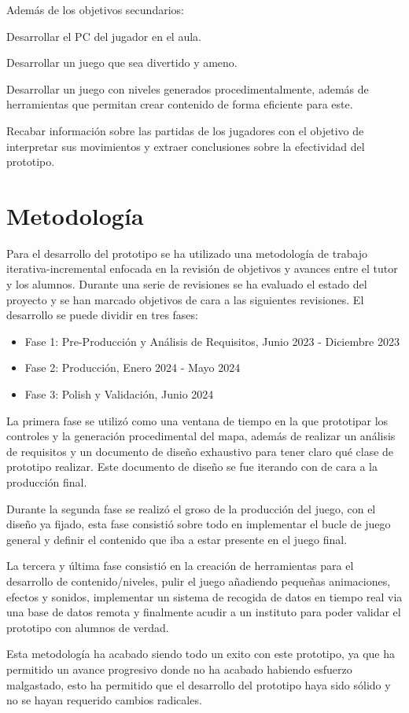Además de los objetivos secundarios:
\begin{compactitem}
  \item Desarrollar el PC del jugador en el aula.
  \item Desarrollar un juego que sea divertido y ameno.
  \item Desarrollar un juego con niveles generados procedimentalmente, además de herramientas que permitan crear contenido de forma eficiente para este.
  \item Recabar información sobre las partidas de los jugadores con el objetivo de interpretar sus movimientos y extraer conclusiones sobre la efectividad del prototipo.
\end{compactitem}

\section{Metodología}

Para el desarrollo del prototipo se ha utilizado una metodología de trabajo iterativa-incremental enfocada en la revisión de objetivos y
avances entre el tutor y los alumnos. Durante una serie de revisiones se ha evaluado el estado del proyecto y se han marcado objetivos de cara a las siguientes revisiones. El desarrollo se puede dividir en tres fases: 
\begin{itemize}
	\item Fase 1: Pre-Producción y Análisis de Requisitos, Junio 2023 - Diciembre 2023
	\item Fase 2: Producción, Enero 2024 - Mayo 2024
	\item Fase 3: Polish y Validación, Junio 2024 
\end{itemize}

La primera fase se utilizó como una ventana de tiempo en la que prototipar los controles y la generación procedimental del mapa, además de realizar un análisis de requisitos y un documento de diseño exhaustivo para tener claro qué clase de prototipo realizar. Este documento de diseño se fue iterando con \nombretutor de cara a la producción final.

Durante la segunda fase se realizó el groso de la producción del juego, con el diseño ya fijado, esta fase consistió sobre todo en implementar el bucle de juego general y definir el contenido que iba a estar presente en el juego final.

La tercera y última fase consistió en la creación de herramientas para el desarrollo de contenido/niveles, pulir el juego añadiendo pequeñas animaciones, efectos y sonidos, implementar un sistema de recogida de datos en tiempo real via una base de datos remota y finalmente acudir a un instituto para poder validar el prototipo con alumnos de verdad.

Esta metodología ha acabado siendo todo un exito con este prototipo, ya que ha permitido un avance progresivo donde no ha acabado habiendo esfuerzo malgastado, esto ha permitido que el desarrollo del prototipo haya sido sólido y no se hayan requerido cambios radicales.